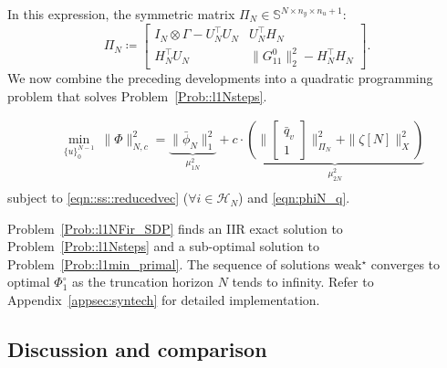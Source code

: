 In this expression, the symmetric matrix \(\Pi_N\in\mathbb{S}^{N \times n_y \times n_u + 1}\):
\[
\Pi_N \coloneqq \begin{bmatrix}
I_N \otimes \Gamma - U_N^\top U_N & U_N^\top H_N\\
H_N^\top U_N & \|G_{11}^{0}\|_2^2 - H_N^\top H_N
\end{bmatrix}.
\]
We now combine the preceding developments into a quadratic programming problem that solves Problem~\ref{Prob::l1Nsteps}. 
\begin{opt}\label{Prob::l1NFir_SDP}
\begin{equation}
\begin{split}
    & \underset{\{u\}_0^{N-1}}{\min}\ \|\Phi\|_{N,c}^2 =  \underbrace{\|\bar{\phi}_N\|_1^2}_{\mu_{1N}^2} + c \cdot \underbrace{\left(\|\begin{bmatrix}
    \bar{q}_v \\ 1
    \end{bmatrix} \|_{\Pi_N}^2 + \|\zeta[N]\|_X^2\right)}_{\mu_{2N}^2}\\
\end{split}
\end{equation}
subject to \eqref{eqn::ss::reducedvec} (\(\forall i\in\mathcal{H}_N\)) and \eqref{eqn:phiN_q}.
\end{opt}
Problem~\ref{Prob::l1NFir_SDP} finds an IIR exact solution to Problem~\ref{Prob::l1Nsteps} and a sub-optimal solution to Problem~\ref{Prob::l1min_primal}. The sequence of solutions weak$^\star$ converges to optimal \(\Phi_1^\circ\) as the truncation horizon $N$ tends to infinity. Refer to Appendix~\ref{appsec:syntech} for detailed implementation.

\subsection{Discussion and comparison}

